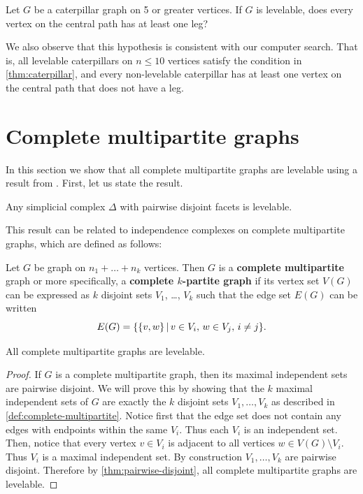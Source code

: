 \begin{question}
Let $G$ be a caterpillar graph on 5 or greater vertices. If $G$ is levelable, does every vertex on the central path has at least one leg?
\end{question}

We also observe that this hypothesis is consistent with our computer search. That is, all levelable caterpillars on $n \leq 10$ vertices satisfy the condition in \autoref{thm:caterpillar}, and every non-levelable caterpillar has at least one vertex on the central path that does not have a leg.

\section{Complete multipartite graphs}

In this section we show that all complete multipartite graphs are levelable using a result from \cite{VanTuyl2010}. First, let us state the result.

\begin{theorem} \label{thm:pairwise-disjoint}
Any simplicial complex $\Delta$ with pairwise disjoint facets is levelable.
\end{theorem}

This result can be related to independence complexes on complete multipartite graphs, which are defined as follows:

\begin{definition} \label{def:complete-multipartite}
Let $G$ be graph on $n_1 + \dots + n_k$ vertices. Then $G$ is a \textbf{complete multipartite} graph or more specifically, a \textbf{complete $k$-partite graph} if its vertex set $V(G)$ can be expressed as $k$ disjoint sets $V_1$, \dots, $V_k$ such that the edge set $E(G)$ can be written 
$$
E(G) = \{  \{ v, w \} \, | \, v \in V_i, \, w \in V_j, \, i \neq j  \}.
$$
\end{definition}

\begin{theorem} \label{thm:complete-multipartite}
All complete multipartite graphs are levelable.
\end{theorem}

\begin{proof} 
If $G$ is a complete multipartite graph, then its maximal independent sets are pairwise disjoint. We will prove this by showing that the $k$ maximal independent sets of $G$ are exactly the $k$ disjoint sets $V_1, \dots, V_k$ as described in \autoref{def:complete-multipartite}. Notice first that the edge set does not contain any edges with endpoints within the same $V_i$. Thus each $V_i$ is an independent set. Then, notice that every vertex $v \in V_i$ is adjacent to all vertices $w \in V(G) \setminus V_i$. Thus $V_i$ is a maximal independent set. By construction $V_1, \dots, V_k$ are pairwise disjoint. Therefore by \autoref{thm:pairwise-disjoint}, all complete multipartite graphs are levelable.
\end{proof}


